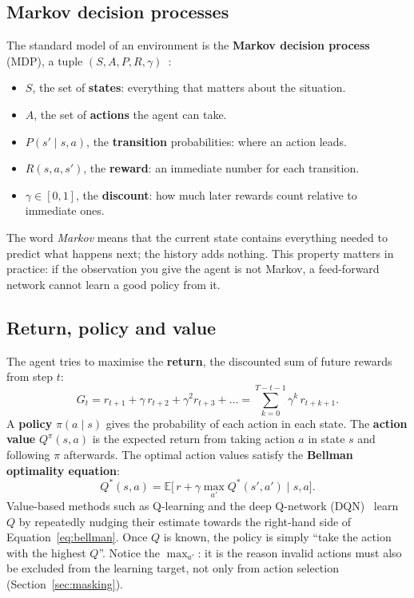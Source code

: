 \documentclass[11pt,a4paper]{article}
\begin{document}
\subsection{Markov decision processes}
The standard model of an environment is the \textbf{Markov decision process} (MDP), a tuple $(S, A, P, R, \gamma)$~\cite{sutton}:
\begin{itemize}
  \item $S$, the set of \textbf{states}: everything that matters about the situation.
  \item $A$, the set of \textbf{actions} the agent can take.
  \item $P(s' \mid s, a)$, the \textbf{transition} probabilities: where an action leads.
  \item $R(s, a, s')$, the \textbf{reward}: an immediate number for each transition.
  \item $\gamma \in [0, 1]$, the \textbf{discount}: how much later rewards count relative to immediate ones.
\end{itemize}
The word \emph{Markov} means that the current state contains everything needed to predict what happens next; the history adds nothing. This property matters in practice: if the observation you give the agent is not Markov, a feed-forward network cannot learn a good policy from it.

\subsection{Return, policy and value}
The agent tries to maximise the \textbf{return}, the discounted sum of future rewards from step $t$:
\begin{equation}
G_t = r_{t+1} + \gamma\, r_{t+2} + \gamma^2 r_{t+3} + \dots = \sum_{k=0}^{T-t-1} \gamma^k\, r_{t+k+1}.
\end{equation}
A \textbf{policy} $\pi(a \mid s)$ gives the probability of each action in each state. The \textbf{action value} $Q^\pi(s, a)$ is the expected return from taking action $a$ in state $s$ and following $\pi$ afterwards. The optimal action values satisfy the \textbf{Bellman optimality equation}:
\begin{equation}
Q^*(s, a) = \mathbb{E}\big[\, r + \gamma \max_{a'} Q^*(s', a') \;\big|\; s, a \big].
\label{eq:bellman}
\end{equation}
Value-based methods such as Q-learning and the deep Q-network (DQN)~\cite{mnih} learn $Q$ by repeatedly nudging their estimate towards the right-hand side of Equation~\eqref{eq:bellman}. Once $Q$ is known, the policy is simply ``take the action with the highest $Q$''. Notice the $\max_{a'}$: it is the reason invalid actions must also be excluded from the learning target, not only from action selection (Section~\ref{sec:masking}).
\end{document}
